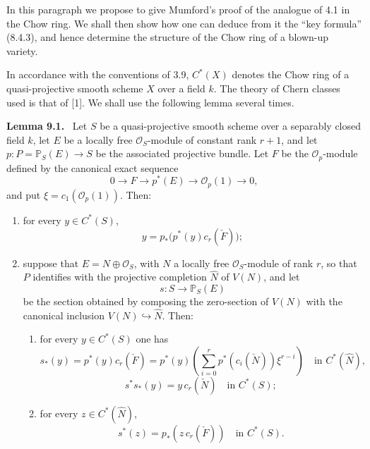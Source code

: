 \documentclass[11pt]{article}
\newenvironment{statement}[1]{\par\medskip\noindent\textbf{#1.}\ }{\par\medskip}
\begin{document}
In this paragraph we propose to give Mumford's proof of the analogue of 4.1 in the Chow ring. We shall then show how one can deduce from it the ``key formula'' (8.4.3), and hence determine the structure of the Chow ring of a blown-up variety.

In accordance with the conventions of 3.9, $C^*(X)$ denotes the Chow ring of a quasi-projective smooth scheme $X$ over a field $k$. The theory of Chern classes used is that of [1]. We shall use the following lemma several times.

\begin{statement}{Lemma 9.1}
Let $S$ be a quasi-projective smooth scheme over a separably closed field $k$, let $E$ be a locally free $\mathcal O_S$-module of constant rank $r+1$, and let $p:P=\mathbb P_S(E)\to S$ be the associated projective bundle. Let $F$ be the $\mathcal O_p$-module defined by the canonical exact sequence
\[
0\to F\to p^*(E)\to\mathcal O_p(1)\to0,
\tag{9.1.0}
\]
and put $\xi=c_1(\mathcal O_p(1))$. Then:
\begin{enumerate}[label=(\roman*)]
\item for every $y\in C^*(S)$,
\[
y=p_*\bigl(p^*(y)c_r(\check F)\bigr);
\tag{9.1.1}
\]
\item suppose that $E=N\oplus\mathcal O_S$, with $N$ a locally free $\mathcal O_S$-module of rank $r$, so that $P$ identifies with the projective completion $\widehat N$ of $V(N)$, and let
\[
s:S\to\mathbb P_S(E)
\]
be the section obtained by composing the zero-section of $V(N)$ with the canonical inclusion $V(N)\hookrightarrow\widehat N$. Then:
\begin{enumerate}[label=(\alph*)]
\item for every $y\in C^*(S)$ one has
\[
s_*(y)=p^*(y)c_r(\check F)=p^*(y)\left(\sum_{i=0}^r p^*(c_i(\check N))\xi^{r-i}\right)
\quad\text{in }C^*(\widehat N),
\tag{9.1.2}
\]
\[
s^*s_*(y)=y\,c_r(\check N)\quad\text{in }C^*(S);
\tag{9.1.3}
\]
\item for every $z\in C^*(\widehat N)$,
\[
s^*(z)=p_*(z\,c_r(\check F))\quad\text{in }C^*(S).
\tag{9.1.4}
\]
\end{enumerate}
\end{enumerate}
\end{statement}
\end{document}
